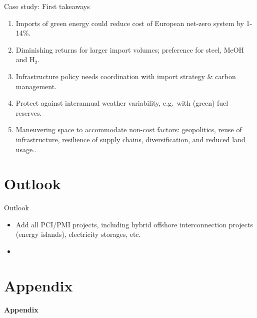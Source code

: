 \documentclass[10pt,aspectratio=169,dvipsnames]{beamer}
\begin{document}
\begin{frame}{Case study: First takeaways}
  \footnotesize
  \begin{enumerate}
    \setlength\itemsep{1em}

    \item Imports of green energy could reduce cost of European net-zero system
      \alert{by 1-14\%}.
  
    \item \alert{Diminishing returns} for larger import volumes; \alert{preference} for steel, MeOH and H$_2$.

    \item Infrastructure policy needs \alert{coordination} with import strategy \& carbon management.
  
    \item Protect against interannual weather variability, e.g.~with \alert{(green) fuel reserves}.

    \item Maneuvering space to accommodate non-cost factors: \alert{geopolitics},
    \alert{reuse} of infrastructure, \alert{resilience} of supply chains,
    diversification, and reduced land usage..

    
  \end{enumerate}

\end{frame}

\section{Outlook}
\begin{frame}{Outlook}
  \begin{itemize}
    \item Add all PCI/PMI projects, including hybrid offshore interconnection projects (energy islands), electricity storages, etc.
    \item  
  \end{itemize}
\end{frame}


\section{Appendix}


\begin{frame}{\textbf{Appendix}}
\end{frame}
\end{document}
